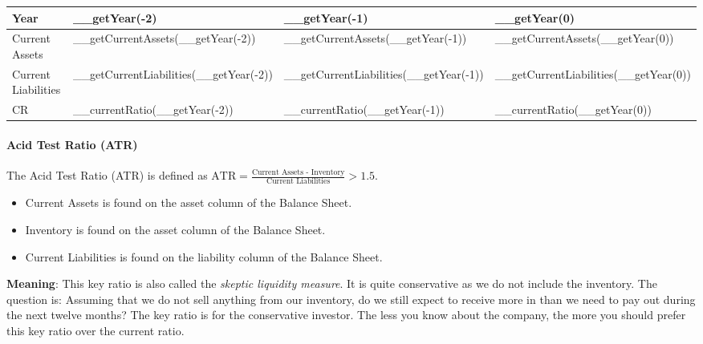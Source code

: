 \begin{tabularx}{\textwidth}{|X|X|X|X|}
 \hline
 Year                    & __getYear(-2)                          & __getYear(-1)                          & __getYear(0)                          \\
 \hline
 Current Assets          & __getCurrentAssets(__getYear(-2))      & __getCurrentAssets(__getYear(-1))      & __getCurrentAssets(__getYear(0))      \\
 Current Liabilities     & __getCurrentLiabilities(__getYear(-2)) & __getCurrentLiabilities(__getYear(-1)) & __getCurrentLiabilities(__getYear(0)) \\
 \rowcolor{lightgray} CR & __currentRatio(__getYear(-2))          & __currentRatio(__getYear(-1))          & __currentRatio(__getYear(0))          \\
 \hline
\end{tabularx}

\paragraph{Acid Test Ratio (ATR)}

The Acid Test Ratio (ATR) is defined as
$\text{ATR} = \frac{\text{Current Assets - Inventory}}{\text{Current Liabilities}} > 1.5$.
\begin{itemize}
    \item Current Assets is found on the asset column of the Balance Sheet.
    \item Inventory is found on the asset column of the Balance Sheet.
    \item Current Liabilities is found on the liability column of the Balance Sheet.
\end{itemize}
\textbf{Meaning}: This key ratio is also called the \textit{skeptic liquidity measure}.
It is quite conservative as we do not include the inventory. The question is: Assuming
that we do not sell anything from our inventory, do we still expect to receive
more in than we need to pay out during the next twelve months? The key ratio is
for the conservative investor. The less you know about the company, the more you
should prefer this key ratio over the current ratio.\\


